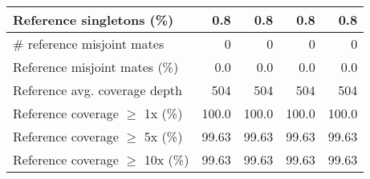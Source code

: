 \documentclass[12pt,a4paper]{article}
\begin{document}
\begin{table}[ht]
\begin{center}
\begin{tabular}{|l*{4}{|r}|}
Reference singletons (\%) & 0.8 & 0.8 & 0.8 & 0.8 \\ \hline
\# reference misjoint mates & 0 & 0 & 0 & 0 \\ \hline
Reference misjoint mates (\%) & 0.0 & 0.0 & 0.0 & 0.0 \\ \hline
Reference avg. coverage depth & 504 & 504 & 504 & 504 \\ \hline
Reference coverage $\geq$ 1x (\%) & 100.0 & 100.0 & 100.0 & 100.0 \\ \hline
Reference coverage $\geq$ 5x (\%) & 99.63 & 99.63 & 99.63 & 99.63 \\ \hline
Reference coverage $\geq$ 10x (\%) & 99.63 & 99.63 & 99.63 & 99.63 \\ \hline
\end{tabular}
\end{center}
\end{table}
\end{document}

